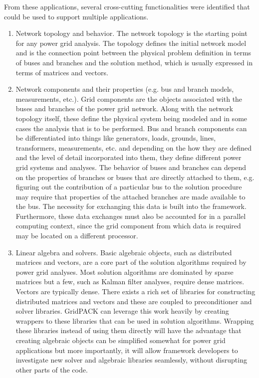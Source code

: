 \documentclass[12pt]{report} %
\begin{document}
From these applications, several cross-cutting functionalities were identified that could be used to support multiple applications.
\begin{enumerate}
\item  Network topology and behavior. The network topology is the starting point for any power grid analysis. The topology defines the initial network model and is the connection point between the physical problem definition in terms of buses and branches and the solution method, which is usually expressed in terms of matrices and vectors.

\item  Network components and their properties (e.g. bus and branch models, measurements, etc.). Grid components are the objects associated with the buses and branches of the power grid network. Along with the network topology itself, these define the physical system being modeled and in some cases the analysis that is to be performed. Bus and branch components can be differentiated into things like generators, loads, grounds, lines, transformers, measurements, etc. and depending on the how they are defined and the level of detail incorporated into them, they define different power grid systems and analyses. The behavior of buses and branches can depend on the properties of branches or buses that are directly attached to them, e.g. figuring out the contribution of a particular bus to the solution procedure may require that properties of the attached branches are made available to the bus. The necessity for exchanging this data is built into the framework. Furthermore, these data exchanges must also be accounted for in a parallel computing context, since the grid component from which data is required may be located on a different processor.

\item  Linear algebra and solvers. Basic algebraic objects, such as distributed matrices and vectors, are a core part of the solution algorithms required by power grid analyses. Most solution algorithms are dominated by sparse matrices but a few, such as Kalman filter analyses, require dense matrices. Vectors are typically dense. There exists a rich set of libraries for constructing distributed matrices and vectors and these are coupled to preconditioner and solver libraries. GridPACK can leverage this work heavily by creating wrappers to these libraries that can be used in solution algorithms. Wrapping these libraries instead of using them directly will have the advantage that creating algebraic objects can be simplified somewhat for power grid applications but more importantly, it will allow framework developers to investigate new solver and algebraic libraries seamlessly, without disrupting other parts of the code.


\end{enumerate}
\end{document}
